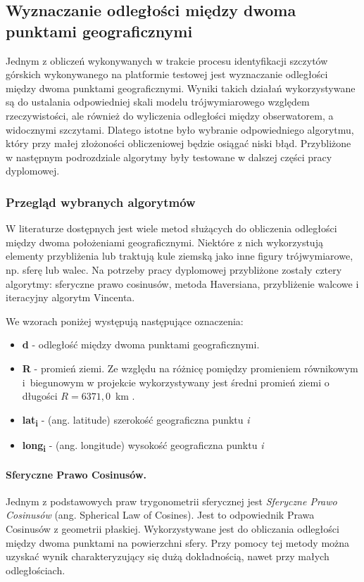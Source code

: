 \subsection{Wyznaczanie odległości między dwoma punktami geograficznymi}

Jednym z obliczeń wykonywanych w trakcie procesu identyfikacji szczytów górskich wykonywanego na platformie testowej jest wyznaczanie odległości między dwoma punktami geograficznymi. Wyniki takich działań wykorzystywane są do ustalania odpowiedniej skali modelu trójwymiarowego względem rzeczywistości, ale również do wyliczenia odległości między obserwatorem, a widocznymi szczytami. Dlatego istotne było wybranie odpowiedniego algorytmu, który przy małej złożoności obliczeniowej będzie osiągać niski błąd. Przybliżone w następnym podrozdziale algorytmy były testowane w dalszej części pracy dyplomowej.

\subsubsection{Przegląd wybranych algorytmów}

W literaturze dostępnych jest wiele metod służących do obliczenia odległości między dwoma położeniami geograficznymi. Niektóre z nich wykorzystują elementy przybliżenia lub traktują kule ziemską jako inne figury trójwymiarowe, np. sferę lub walec. Na potrzeby pracy dyplomowej przybliżone zostały cztery algorytmy: sferyczne prawo cosinusów, metoda Haversiana, przybliżenie walcowe i iteracyjny algorytm Vincenta.

We wzorach poniżej występują następujące oznaczenia:

\begin{itemize}
    \item \textbf{d} - odległość między dwoma punktami geograficznymi.
    \item \textbf{R} - promień ziemi. Ze względu na różnicę pomiędzy promieniem równikowym i~biegunowym w projekcie wykorzystywany jest średni promień ziemi o długości $R=6371,0$~km \cite{promien_ziemi}.
    \item  \textbf{lat\textsubscript{i}} - (ang. latitude) szerokość geograficzna punktu \textit{i}
    \item  \textbf{long\textsubscript{i}} - (ang. longitude) wysokość geograficzna punktu \textit{i}
\end{itemize}



\paragraph{Sferyczne Prawo Cosinusów.} Jednym z podstawowych praw trygonometrii sferycznej jest \textit{Sferyczne Prawo Cosinusów} (ang. Spherical Law of Cosines). \cite{distance_geo} Jest to odpowiednik Prawa Cosinusów z geometrii płaskiej. Wykorzystywane jest do obliczania odległości między dwoma punktami na powierzchni sfery. Przy pomocy tej metody można uzyskać wynik charakteryzujący się dużą dokładnością, nawet przy małych odległościach.

